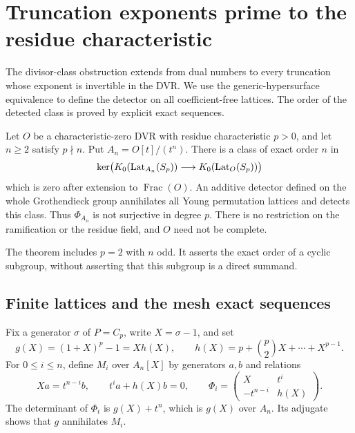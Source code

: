\section{Truncation exponents prime to the residue characteristic}
\label{sec:prime-to-p-all-dvr}

The divisor-class obstruction extends from dual numbers to every
truncation whose exponent is invertible in the DVR.  We use the
generic-hypersurface equivalence to define the detector on all
coefficient-free lattices.  The order of the detected class is proved
by explicit exact sequences.

\begin{theorem}\label{thm:prime-to-p-all-dvr}
Let \(O\) be a characteristic-zero DVR with residue characteristic
\(p>0\), and let \(n\ge2\) satisfy \(p\nmid n\).  Put
\(A_n=O[t]/(t^n)\).  There is a class of exact order \(n\) in
\[
 \ker\bigl(K_0(\operatorname{Lat}_{A_n}(S_p))
                   \longrightarrow K_0(\operatorname{Lat}_O(S_p))\bigr)
\]
which is zero after extension to \(\operatorname{Frac}(O)\).
An additive detector defined on the whole Grothendieck group
annihilates all Young permutation lattices and detects this class.
Thus \(\Phi_{A_n}\) is not surjective in degree \(p\).
There is no restriction on the ramification or the residue field,
and \(O\) need not be complete.
\end{theorem}

The theorem includes \(p=2\) with \(n\) odd.  It asserts the exact
order of a cyclic subgroup, without asserting that this subgroup
is a direct summand.

\subsection{Finite lattices and the mesh exact sequences}

Fix a generator \(\sigma\) of \(P=C_p\), write \(X=\sigma-1\), and set
\[
 g(X)=(1+X)^p-1=Xh(X),\qquad
 h(X)=p+\binom p2X+\cdots+X^{p-1}.
\]
For \(0\le i\le n\), define \(M_i\) over \(A_n[X]\) by generators
\(a,b\) and relations
\begin{equation}\label{eq:prime-to-p-presentations}
 Xa=t^{n-i}b,\qquad t^ia+h(X)b=0,
 \qquad
 \Phi_i=
 \begin{pmatrix}X&t^i\\-t^{n-i}&h(X)\end{pmatrix}.
\end{equation}
The determinant of \(\Phi_i\) is \(g(X)+t^n\), which is \(g(X)\)
over \(A_n\).  Its adjugate shows that \(g\) annihilates \(M_i\).

